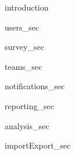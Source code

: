 {introduction}

{users_sec}

{survey_sec}

{teams_sec}

{notifications_sec}

{reporting_sec}

{analysis_sec}

{importExport_sec}